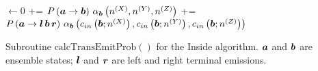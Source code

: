 \documentclass[10pt]{article}
\begin{document}
\begin{algorithm}[!ht]
  \SetLine

  \emitProb $\leftarrow 0$\;
   {
    \emitProb += $P \left( \boldsymbol{a} \to \boldsymbol{b} \right)\, \alpha_{\boldsymbol{b}}\left( n^{(X)}, n^{(Y)}, n^{(Z)} \right)$\;
  }
   {
    \emitProb += $P \left( \boldsymbol{a} \to \boldsymbol{l}\,\boldsymbol{b}\,\boldsymbol{r} \right)\, \alpha_{\boldsymbol{b}}\left( c_{in}\left(\boldsymbol{b}; n^{(X)}\right), c_{in}\left(\boldsymbol{b}; n^{(Y)}\right), c_{in}\left(\boldsymbol{b}; n^{(Z)}\right) \right)$\;
  }
  \KwRet{\emitProb}\;
  \caption{
    Subroutine $\mathrm{calcTransEmitProb}()$ for the Inside algorithm.
    $\boldsymbol{a}$ and $\boldsymbol{b}$ are ensemble states; $\boldsymbol{l}$ and $\boldsymbol{r}$ are left and right terminal emissions.
  }
\end{algorithm}
\end{document}
